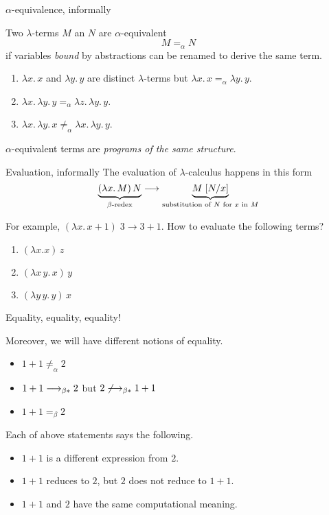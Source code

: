 \begin{frame}{$\alpha$-equivalence, informally}
  \begin{definition}
    Two $\lambda$-terms $M$ an $N$ are \alert{$\alpha$-equivalent} 
    \[
      M =_\alpha N
    \]
    if variables \emph{bound} by abstractions can be renamed to derive the same term. 
  \end{definition}
  \begin{example}
    \begin{enumerate}
      \item $\lambda x.\, x$ and $\lambda y.\, y$ are distinct $\lambda$-terms but $\lambda x.\, x
        =_\alpha \lambda y.\, y$. 
      \item $\lambda x.\, \lambda y.\, y =_\alpha 
        \lambda z.\, \lambda y.\, y$. 
      \item $\lambda x.\, \lambda y.\, x \mathrel{\neq}_\alpha
        \lambda x.\, \lambda y.\, y$. 
    \end{enumerate}
  \end{example}
  $\alpha$-equivalent terms are \emph{programs of the same structure}.
  
\end{frame}

\begin{frame}{Evaluation, informally}
  The \alert{evaluation} of $\lambda$-calculus happens in this form 
  \[
    \underbrace{(\lambda x.\, M)\,N}_{\beta\text{-redex}} \longrightarrow 
    \underbrace{M\;[{N}/{x}]}_{\text{substitution of $N$ for $x$ in $M$}}
  \]

  For example, $(\lambda x.\, x +1)\;3 \to 3 + 1$.
  How to evaluate the following terms? 
  \begin{enumerate}
    \item $(\lambda x.x)\,z$
    \item $(\lambda x\, y.\,x)\,y$
    \item $(\lambda y\, y.\,y)\,x$
  \end{enumerate}
\end{frame}

\begin{frame}{Equality, equality, equality!}

  Moreover, we will have different notions of \alert{equality}.

  \begin{itemize}
    \item $1 + 1 \neq_\alpha 2$
    \item $1 + 1 \longrightarrow_{\beta*} 2$ but $2 \not\longrightarrow_{\beta*} 1 + 1$
    \item $1 + 1 =_\beta 2$
  \end{itemize}
  Each of above statements says the following.
  \begin{itemize}
    \item $1 + 1$ is a different expression from $2$.
    \item $1 + 1$ reduces to $2$, but $2$ does not reduce to $1 + 1$.
    \item $1 + 1$ and $2$ have the same computational meaning.
  \end{itemize}
\end{frame}

